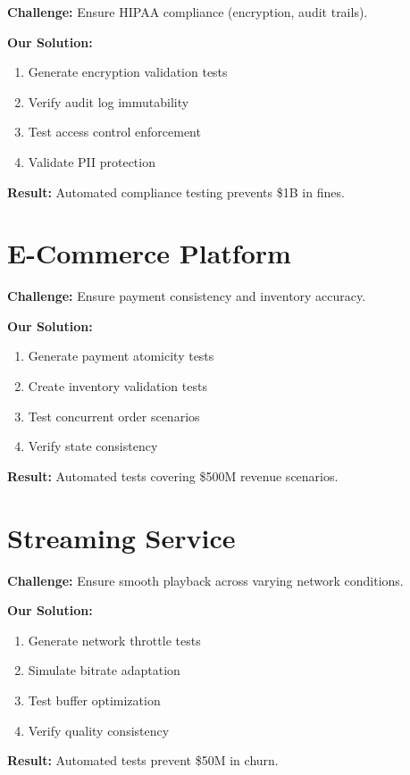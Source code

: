 \documentclass[12pt,oneside]{report}
\begin{document}
\textbf{Challenge:} Ensure HIPAA compliance (encryption, audit trails).

\textbf{Our Solution:}
\begin{enumerate}
    \item Generate encryption validation tests
    \item Verify audit log immutability
    \item Test access control enforcement
    \item Validate PII protection
\end{enumerate}

\textbf{Result:} Automated compliance testing prevents \$1B in fines.

\section{E-Commerce Platform}

\textbf{Challenge:} Ensure payment consistency and inventory accuracy.

\textbf{Our Solution:}
\begin{enumerate}
    \item Generate payment atomicity tests
    \item Create inventory validation tests
    \item Test concurrent order scenarios
    \item Verify state consistency
\end{enumerate}

\textbf{Result:} Automated tests covering \$500M revenue scenarios.

\section{Streaming Service}

\textbf{Challenge:} Ensure smooth playback across varying network conditions.

\textbf{Our Solution:}
\begin{enumerate}
    \item Generate network throttle tests
    \item Simulate bitrate adaptation
    \item Test buffer optimization
    \item Verify quality consistency
\end{enumerate}

\textbf{Result:} Automated tests prevent \$50M in churn.
\end{document}
